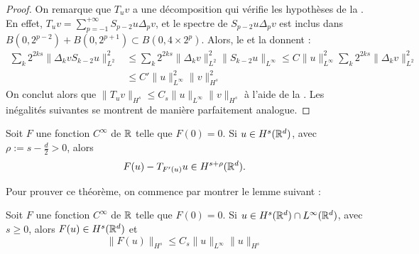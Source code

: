 \documentclass[11pt,a4paper]{article}
\begin{document}
\begin{proof}
On remarque que $T_uv$ a une décomposition qui vérifie les hypothèses de la . En effet, $T_uv=\sum_{p=-1}^{+\infty}S_{p-2}u\Delta_pv$, et le spectre de $S_{p-2}u\Delta_pv$ est inclus dans $B(0,2^{p-2})+B(0,2^{p+1}) \subset B(0,4\times2^p)$. Alors, le  et la  donnent :
\begin{align*}
\sum_k 2^{2ks} \|\Delta_kvS_{k-2}u \|^2_{L^2} &\leq \sum_k 2^{2ks} \|\Delta_kv \|^2_{L^2} \|S_{k-2}u\|_{L^\infty} \leq C \|u\|_{L^\infty}^2 \sum_k 2^{2ks} \|\Delta_kv \|^2_{L^2} \\
&\leq  C' \|u\|_{L^\infty}^2 \|v\|_{H^s}^2
\end{align*}
On conclut alors que $\|T_uv\|_{H^s} \leq C_s \|u\|_{L^\infty} \|v\|_{H^s}$ à l'aide de la . Les inégalités suivantes se montrent de manière parfaitement analogue.
\end{proof}
%


\begin{thm}[Paralinéarisation]\label{paralin}
Soit $F$ une fonction $C^{\infty}$ de $\mathbb R$ telle que $F(0)=0$. Si $u\in H^s(\mathbb R^d)$, avec $\rho := s - \frac{d}{2}>0 $, alors 
\begin{equation}
F(u) - T_{F'(u)}u \in H^{s+\rho}(\mathbb R^d).
\end{equation}
\end{thm}
Pour prouver ce théorème, on commence par montrer le lemme suivant : 


\begin{lemma}\label{lem_paralin}
Soit $F$ une fonction $C^{\infty}$ de $\mathbb R$ telle que $F(0)=0$. Si $u\in H^s(\mathbb R^d)\cap L^{\infty}(\mathbb R^d) $, avec $s\geq 0 $, alors $F(u) \in H^s(\mathbb R^d)$ et 
\begin{equation}
\|F(u)\|_{H^s} \leq C_s \|u\|_{L^{\infty}} \|u\|_{H^s}
\end{equation}
\end{lemma}
\end{document}
